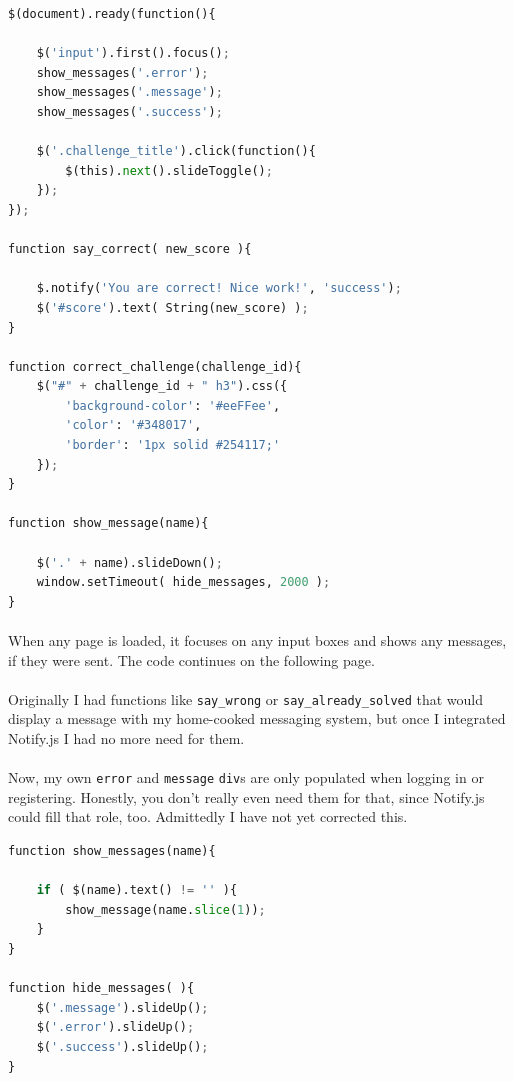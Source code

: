 \documentclass[11pt]{article}
\begin{document}
	\begin{lstlisting}[language=python]
$(document).ready(function(){

	$('input').first().focus();
	show_messages('.error');
	show_messages('.message');
	show_messages('.success');

	$('.challenge_title').click(function(){
		$(this).next().slideToggle();
	});
});

function say_correct( new_score ){

	$.notify('You are correct! Nice work!', 'success');
	$('#score').text( String(new_score) );
}

function correct_challenge(challenge_id){
	$("#" + challenge_id + " h3").css({
		'background-color': '#eeFFee',
		'color': '#348017',
		'border': '1px solid #254117;'
	});
}

function show_message(name){

	$('.' + name).slideDown();
	window.setTimeout( hide_messages, 2000 );
}
\end{lstlisting}

	\paragraph{} When any page is loaded, it focuses on any input boxes and shows any messages, if they were sent. The code continues on the following page.

	\paragraph{} Originally I had functions like \texttt{say\_wrong} or \texttt{say\_already\_solved} that would display a message with my home-cooked messaging system, but once I integrated Notify.js I had no more need for them.

	\paragraph{} Now, my own \texttt{error} and \texttt{message} \texttt{div}s are only populated when logging in or registering. Honestly, you don't really even need them for that, since Notify.js could fill that role, too. Admittedly I have not yet corrected this.

	\newpage

\begin{lstlisting}[language=python]
function show_messages(name){

	if ( $(name).text() != '' ){
		show_message(name.slice(1));
	}	
}

function hide_messages( ){
	$('.message').slideUp();
	$('.error').slideUp();
	$('.success').slideUp();
}
\end{lstlisting}
\end{document}
